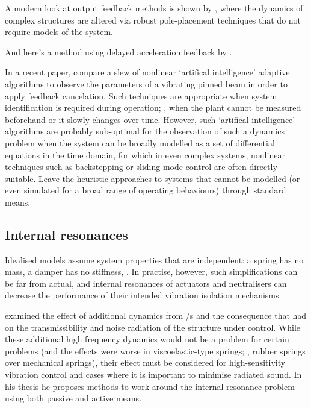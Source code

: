 A modern look at output feedback methods is shown by \cite{mottershead2008}, where the dynamics of complex structures are altered via robust pole-placement techniques that do not require models of the system.

And here's a method using delayed acceleration feedback by \textcite{chatterjee2008}.

In a recent paper, \textcite{madkour2007} compare a slew of nonlinear `artifical intelligence' adaptive algorithms to observe the parameters of a vibrating pinned beam in order to apply feedback cancelation.
Such techniques are appropriate when system identification is required during operation; \ie, when the plant cannot be measured beforehand or it slowly changes over time.
However, such `artifical intelligence' algorithms are probably sub-optimal for the observation of such a dynamics problem when the system can be broadly modelled as a set of differential equations in the time domain, for which in even complex systems, nonlinear techniques such as backstepping or sliding mode control are often directly suitable.
Leave the heuristic approaches to systems that cannot be modelled (or even simulated for a broad range of operating behaviours) through standard means.



\subsection{Internal resonances}

Idealised models assume system properties that are independent: a spring has no mass, a damper has no stiffness, \etc.
In practise, however, such simplifications can be far from actual, and internal resonances of actuators and neutralisers can decrease the performance of their intended vibration isolation mechanisms.

\textcite{du2003thesis} examined the effect of additional dynamics from \vibneut/s and the consequence that had on the transmissibility and noise radiation of the structure under control.
While these additional high frequency dynamics would not be a problem for certain problems (and the effects were worse in viscoelastic-type springs; \ie, rubber springs over mechanical springs), their effect must be considered for high-sensitivity vibration control and cases where it is important to minimise radiated sound.
In his thesis he proposes methods to work around the internal resonance problem using both passive and active means.

